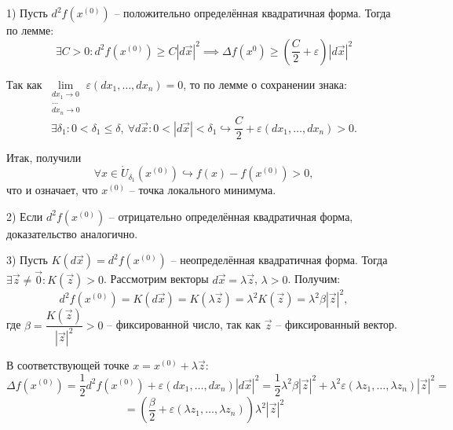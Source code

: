 \documentclass[12pt, a4paper, reqno]{article}
\begin{document}
    1) Пусть $d^2 f(x^{(0)})$ -- положительно определённая квадратичная форма. Тогда по лемме:
    \begin{equation*}
        \exists C > 0: d^2 f(x^{(0)}) \geq C|d\vec{x}|^2 \implies
        \Delta f(x^{0}) \geq \left(\frac{C}{2} + \varepsilon\right)|d\vec{x}|^2
    \end{equation*}

    Так как $\lim\limits_{\substack{dx_1 \to 0 \\ \ldots \\ dx_n \to 0}} \varepsilon(dx_1, \ldots, dx_n) = 0$,
    то по лемме о сохранении знака:
    \begin{equation*}
        \exists \delta_1: 0 < \delta_1 \leq \delta,\ \forall d\vec{x}: 0 < |d\vec{x}| < \delta_1
        \hookrightarrow \frac{C}{2} + \varepsilon(dx_1, \ldots, dx_n) > 0.
    \end{equation*}

    Итак, получили
    \begin{equation*}
        \forall x \in \mathring U_{\delta_1}(x^{(0)}) \hookrightarrow f(x) - f(x^{(0)}) > 0,
    \end{equation*}
    что и означает, что $x^{(0)}$ -- точка локального минимума.

    2) Если $d^2 f(x^{(0)})$ -- отрицательно определённая квадратичная форма, доказательство аналогично.

    3) Пусть $K(d\vec{x}) = d^2 f(x^{(0)})$ -- неопределённая квадратичная форма. Тогда
    $\exists \vec{z} \neq \vec{0}: K(\vec{z}) > 0$. Рассмотрим векторы $d\vec{x} = \lambda\vec{z}$,
    $\lambda > 0$. Получим:
    \begin{equation*}
        d^2 f(x^{(0)}) = K(d\vec{x}) = K(\lambda \vec{z}) = \lambda^2 K(\vec{z}) =
        \lambda^2 \beta |\vec{z}|^2,
    \end{equation*}
    где $\beta = \dfrac{K(\vec{z})}{|\vec{z}|^2} > 0$ -- фиксированной число, так как $\vec{z}$ --
    фиксированный вектор.

    В соответствующей точке $x = x^{(0)} + \lambda\vec{z}$:
    \begin{equation*}
        \Delta f(x^{(0)}) = \frac{1}{2}d^2 f(x^{(0)}) + \varepsilon(dx_1, \ldots, dx_n) |d\vec{x}|^2 =
        \frac{1}{2}\lambda^2 \beta |\vec{z}|^2 +
            \lambda^2 \varepsilon(\lambda z_1, \ldots, \lambda z_n) |\vec{z}|^2 =
    \end{equation*}
    \begin{equation*}
        = \left(\frac{\beta}{2} + \varepsilon(\lambda z_1, \ldots, \lambda z_n)\right)\lambda^2 |\vec{z}|^2
    \end{equation*}
\end{document}

